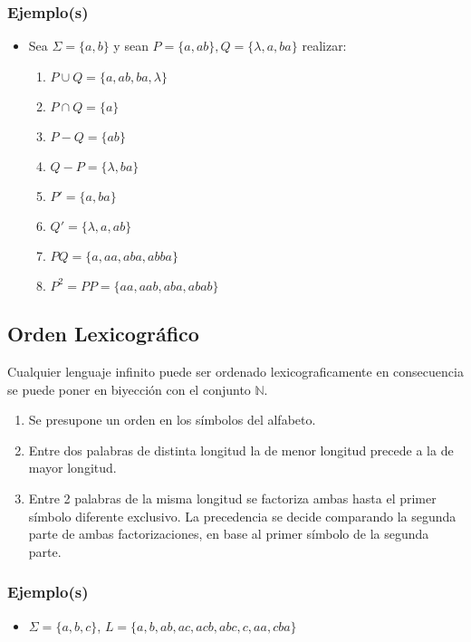 \subsubsection{Ejemplo(s)}
\begin{itemize}
\item Sea $\Sigma =\{ a,b \}$ y sean $P=\{a,ab\}, Q=\{ \lambda, a,ba \}$ realizar:
\begin{enumerate}[label = \alph*)]
\item $P\cup Q= \{ a,ab,ba,\lambda \}$
\item $P\cap Q= \{ a \}$
\item $P - Q  =\{ ab \} $
\item $Q - P  = \{ \lambda,ba \}$ 
\item $P' = \{ a,ba \}$
\item $Q' = \{ \lambda,a,ab \}$
\item $PQ = \{ a,aa,aba,abba \}$
\item $P^2=PP =\{ aa,aab,aba,abab \}$
\end{enumerate}
\end{itemize}
\subsection{Orden Lexicográfico}
Cualquier lenguaje infinito puede ser ordenado lexicograficamente en consecuencia se puede poner en biyección con el conjunto $\mathbb{N}$.
\begin{enumerate}
\item Se presupone un orden en los símbolos del alfabeto.
\item Entre dos palabras de distinta longitud la de menor longitud precede a la de mayor longitud.
\item Entre 2 palabras de la misma longitud se factoriza ambas hasta el primer símbolo diferente exclusivo. La precedencia se decide comparando la segunda parte de ambas factorizaciones, en base al primer símbolo de la segunda parte.
\end{enumerate}

\subsubsection*{Ejemplo(s)}

\begin{itemize}
\item $\Sigma = \{ a,b,c \}$, $L=\{ a,b,ab,ac,acb,abc,c,aa,cba \}$
\end{itemize}

